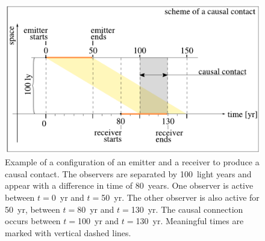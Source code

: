 \documentclass[crop]{CSLB}
\begin{document}
\begin{figure}[h]
%
\centering
%
\includegraphics[width=\columnwidth]{F_example.pdf}
%
\caption{Example of a configuration of an emitter and a receiver 
   to produce a causal contact.
   The observers are separated by 100~light years and appear with a
   difference in time of 80~years. One observer is active between
   $t=$0~yr and $t=$50~yr.  The other observer is also active for
   50~yr, between $t=$80~yr and $t=$130~yr. 
   The causal connection occurs between $t=$100~yr and $t=$130~yr.
   Meaningful times are marked with vertical dashed lines.
   }
%
\label{F_example}
%
\end{figure}
\end{document}
